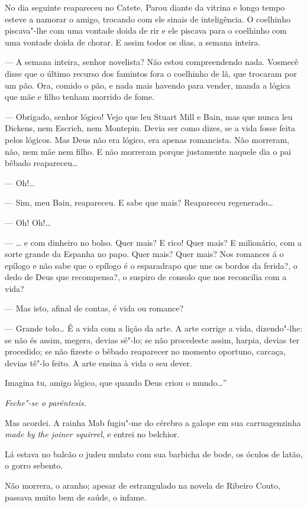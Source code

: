 No dia seguinte reapareceu no Catete. Parou diante da vitrina e longo
tempo esteve a namorar o amigo, trocando com ele sinais de inteligência.
O coelhinho piscava"-lhe com uma vontade doida de rir e ele piscava para
o coelhinho com uma vontade doida de chorar. E assim todos os dias, a
semana inteira.

--- A semana inteira, senhor novelista? Não estou compreendendo nada.
Vosmecê disse que o último recurso dos famintos fora o coelhinho de lã,
que trocaram por um pão. Ora, comido o pão, e nada mais havendo para
vender, manda a lógica que mãe e filho tenham morrido de fome.

--- Obrigado, senhor lógico! Vejo que leu Stuart Mill e Bain, mas que
nunca leu Dickens, nem Escrich, nem Montepin. Devia ser como dizes, se a
vida fosse feita pelos lógicos. Mas Deus não era lógico, era apenas
romancista. Não morreram, não, nem mãe nem filho. E não morreram porque
justamente naquele dia o pai bêbado reapareceu\ldots{}

--- Oh!\ldots{}

--- Sim, meu Bain, reapareceu. E sabe que mais? Reapareceu regenerado\ldots{}

--- Oh! Oh!\ldots{}

--- \ldots{} e com dinheiro no bolso. Quer mais? E rico! Quer mais? E
milionário, com a sorte grande da Espanha no papo. Quer mais? Quer mais?
Nos romances á o epílogo e não sabe que o epílogo é o esparadrapo que
une os bordos da ferida?, o dedo de Deus que recompensa?, o suspiro de
consolo que nos reconcilia com a vida?

--- Mas isto, afinal de contas, é vida ou romance?

--- Grande tolo\ldots{} É a vida com a lição da arte. A arte corrige a vida,
dizendo"-lhe: se não és assim, megera, devias sê"-lo; se não procedeste
assim, harpia, devias ter procedido; se não fizeste o bêbado reaparecer
no momento oportuno, carcaça, devias tê"-lo feito. A arte ensina à vida o
seu dever.

Imagina tu, amigo lógico, que quando Deus criou o mundo\ldots{}''

\emph{Feche"-se o parêntesis.}

Mas acordei. A rainha Mab fugiu"-me do cérebro a galope em sua
carruagenzinha \emph{made by the joiner squirrel}, e entrei no belchior.

Lá estava no balcão o judeu mulato com sua barbicha de bode, os óculos
de latão, o gorro sebento.

Não morrera, o aranho; apesar de estrangulado na novela de Ribeiro
Couto, passava muito bem de saúde, o infame.

